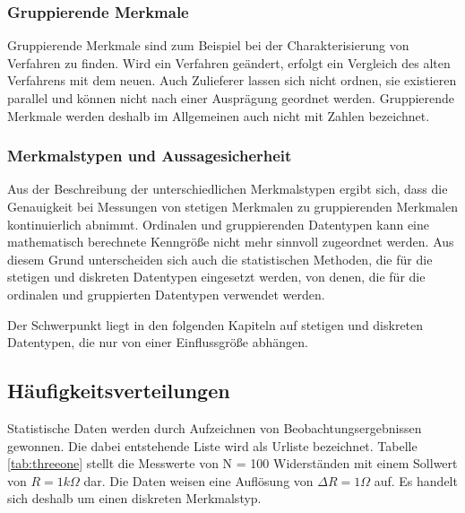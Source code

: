 \subsubsection{Gruppierende Merkmale}

\noindent Gruppierende Merkmale sind zum Beispiel bei der Charakterisierung von Verfahren zu finden. Wird ein Verfahren ge\"{a}ndert, erfolgt ein Vergleich des alten Verfahrens mit dem neuen. Auch Zulieferer lassen sich nicht ordnen, sie existieren parallel und k\"{o}nnen nicht nach einer Auspr\"{a}gung geordnet werden. Gruppierende Merkmale werden deshalb im Allgemeinen auch nicht mit Zahlen bezeichnet. 


\subsubsection{Merkmalstypen und Aussagesicherheit}

\noindent Aus der Beschreibung der unterschiedlichen Merkmalstypen ergibt sich, dass die Genauigkeit bei Messungen von stetigen Merkmalen zu gruppierenden Merkmalen kontinuierlich abnimmt. Ordinalen und gruppierenden Datentypen kann eine mathematisch berechnete Kenngr\"{o}{\ss}e nicht mehr sinnvoll zugeordnet werden. Aus diesem Grund unterscheiden sich auch die statistischen Methoden, die f\"{u}r die stetigen und diskreten Datentypen eingesetzt werden, von denen, die f\"{u}r die ordinalen und gruppierten Datentypen verwendet werden. 

\noindent Der Schwerpunkt liegt in den folgenden Kapiteln auf stetigen und diskreten Datentypen, die nur von einer Einflussgr\"{o}{\ss}e abh\"{a}ngen. 

\clearpage

\subsection{H\"{a}ufigkeitsverteilungen}

\noindent Statistische Daten werden durch Aufzeichnen von Beobachtungsergebnissen gewonnen. Die dabei entstehende Liste wird als Urliste bezeichnet. Tabelle \ref{tab:threeone} stellt die Messwerte von N = 100 Widerst\"{a}nden mit einem Sollwert von $R = 1 k\Omega$ dar. Die Daten weisen eine Aufl\"{o}sung von $\Delta R = 1 \Omega$ auf. Es handelt sich deshalb um einen diskreten Merkmalstyp.

